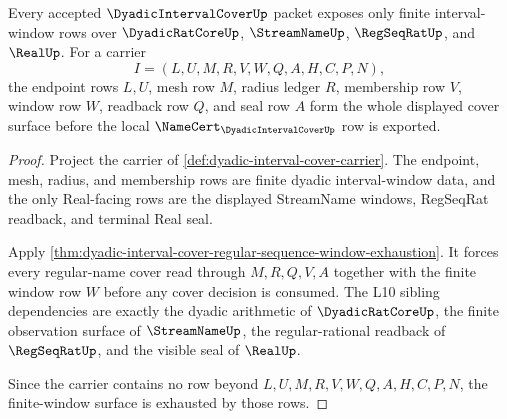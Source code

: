 \begin{theorem}
\label{thm:dyadicintervalcover-finite-window-carrier}
Every accepted $\DyadicIntervalCoverUp$ packet exposes only finite interval-window rows over $\DyadicRatCoreUp$, $\StreamNameUp$, $\RegSeqRatUp$, and $\RealUp$. For a carrier
$$
I=(L,U,M,R,V,W,Q,A,H,C,P,N),
$$
the endpoint rows $L,U$, mesh row $M$, radius ledger $R$, membership row $V$, window row $W$, readback row $Q$, and seal row $A$ form the whole displayed cover surface before the local $\NameCert_{\DyadicIntervalCoverUp}$ row is exported.
\end{theorem}
\begin{proof}
Project the carrier of \autoref{def:dyadic-interval-cover-carrier}. The endpoint, mesh, radius, and membership rows are finite dyadic interval-window data, and the only Real-facing rows are the displayed StreamName windows, RegSeqRat readback, and terminal Real seal.

Apply \autoref{thm:dyadic-interval-cover-regular-sequence-window-exhaustion}. It forces every regular-name cover read through $M,R,Q,V,A$ together with the finite window row $W$ before any cover decision is consumed. The L10 sibling dependencies are exactly the dyadic arithmetic of $\DyadicRatCoreUp$, the finite observation surface of $\StreamNameUp$, the regular-rational readback of $\RegSeqRatUp$, and the visible seal of $\RealUp$.

Since the carrier contains no row beyond $L,U,M,R,V,W,Q,A,H,C,P,N$, the finite-window surface is exhausted by those rows.
\end{proof}

